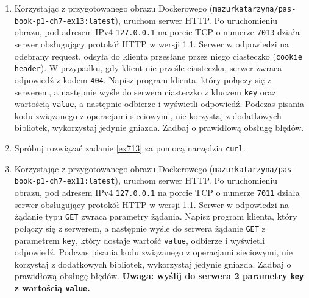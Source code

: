 \documentclass{article}
\begin{document}
\begin{enumerate}[label=\textbf{7.\arabic*}]
\item \label{ex713}  Korzystając z przygotowanego obrazu Dockerowego (\texttt{mazurkatarzyna/pas-book-p1-ch7-ex13:latest}), uruchom serwer HTTP.  Po uruchomieniu obrazu, pod adresem IPv4 \texttt{127.0.0.1} na porcie TCP o numerze \texttt{7013} działa serwer obsługujący protokół HTTP w wersji 1.1. Serwer w odpowiedzi na odebrany request, odsyła do klienta przesłane przez niego ciasteczko (\texttt{cookie header}). W przypadku, gdy klient nie prześle ciasteczka, serwer zwraca odpowiedź z kodem \texttt{404}. Napisz program klienta, który połączy się z serwerem, a następnie wyśle do serwera ciasteczko z kluczem \texttt{key} oraz wartością \texttt{value}, a następnie odbierze i wyświetli odpowiedź.  Podczas pisania kodu związanego z operacjami sieciowymi, nie korzystaj z dodatkowych bibliotek, wykorzystaj jedynie gniazda. Zadbaj o prawidłową obsługę błędów.

\item Spróbuj rozwiązać zadanie \ref{ex713} za pomocą narzędzia \texttt{curl}.  

\item \label{ex715} Korzystając z przygotowanego obrazu Dockerowego (\texttt{mazurkatarzyna/pas-book-p1-ch7-ex11:latest}), uruchom serwer HTTP.  Po uruchomieniu obrazu, pod adresem IPv4 \texttt{127.0.0.1} na porcie TCP o numerze \texttt{7011} działa serwer obsługujący protokół HTTP w wersji 1.1. Serwer w odpowiedzi na żądanie typu \texttt{GET} zwraca parametry żądania. Napisz program klienta, który połączy się z serwerem, a następnie wyśle do serwera żądanie \texttt{GET} z parametrem \texttt{key}, który dostaje wartość \texttt{value}, odbierze i wyświetli odpowiedź. Podczas pisania kodu związanego z operacjami sieciowymi, nie korzystaj z dodatkowych bibliotek, wykorzystaj jedynie gniazda. Zadbaj o prawidłową obsługę błędów. \textbf{Uwaga: wyślij do serwera 2 parametry \texttt{key} z wartością \texttt{value}.} 


\end{enumerate}
\end{document}

